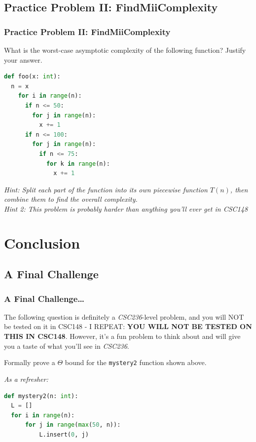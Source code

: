 \documentclass[hyperref={colorlinks,citecolor=blue,linkcolor=blue,urlcolor=blue}, aspectratio=1610]{beamer}
\begin{document}
\subsection{Practice Problem II: FindMiiComplexity}
\begin{frame}[fragile]
  \frametitle{Practice Problem II: FindMiiComplexity}
  What is the worst-case asymptotic complexity of the following function? Justify your answer.
  \begin{lstlisting}[language=Python,style=mystyle]
def foo(x: int):
  n = x
    for i in range(n):
      if n <= 50:
        for j in range(n):
          x += 1
      if n <= 100:
        for j in range(n):
          if n <= 75:
            for k in range(n):
              x += 1
  \end{lstlisting}
  \textit{Hint: Split each part of the function into its own piecewise function $T(n)$, then combine them to find the overall complexity.}\\
  \textit{Hint 2: This problem is probably harder than anything you'll ever get in CSC148}\\
\end{frame}

\section{Conclusion}

\subsection{A Final Challenge}
\begin{frame}[fragile]
  \frametitle{A Final Challenge\ldots}
  The following question is definitely a \textit{CSC236}-level problem, and you will NOT be tested on it in CSC148 - I REPEAT: \textbf{YOU WILL NOT BE TESTED ON THIS IN CSC148}. However, it's a fun problem to think about and will give you a taste of what you'll see in \textit{CSC236}.

  Formally prove a $\Theta$ bound for the \texttt{mystery2} function shown above. 
   
  \textit{As a refresher:}
  \begin{lstlisting}[language=Python,style=mystyle]
def mystery2(n: int):
  L = []
  for i in range(n):
      for j in range(max(50, n)):
          L.insert(0, j)
  \end{lstlisting}
\end{frame}
\end{document}
